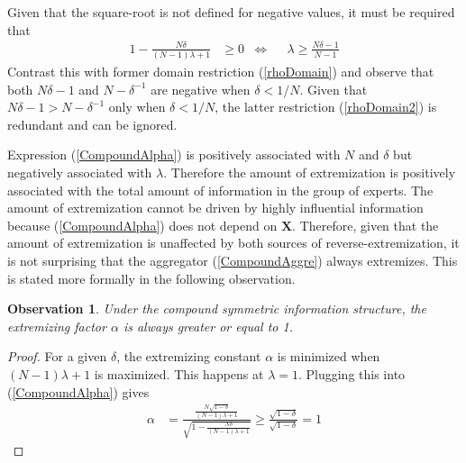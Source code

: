 \documentclass[11pt,twoside]{article}
\newtheorem{observation}[theorem]{Observation}
\theoremstyle{definition}
\theoremstyle{definition}
\begin{document}
Given that the square-root is not defined for negative values,  it must be required that
\begin{align}
1- \frac{N\delta}{(N-1)\lambda +1}  &\geq 0 &\Leftrightarrow&& \lambda \geq \frac{N\delta - 1}{N-1} \label{rhoDomain2}
\end{align}
Contrast this with former domain restriction (\ref{rhoDomain}) and observe that both $N\delta - 1$ and $N - \delta^{-1}$ are negative when $\delta < 1/N$. Given that $N\delta - 1 > N - \delta^{-1}$ only when $\delta < 1/N$, the latter restriction (\ref{rhoDomain2}) is redundant and can be ignored. 

Expression (\ref{CompoundAlpha}) is positively associated with $N$ and $\delta$ but negatively associated with $\lambda$. Therefore the amount of extremization is positively associated with the total amount of information in the group of experts. The amount of extremization cannot be driven by highly influential information because (\ref{CompoundAlpha}) does not depend on $\boldsymbol{X}$. Therefore, given that the amount of extremization is unaffected by both sources of reverse-extremization, it is not surprising that the aggregator (\ref{CompoundAggre}) always extremizes. This is stated more formally in the following observation.

\begin{observation}
\label{positiveThm}
Under the compound symmetric information structure, the extremizing factor $\alpha$ is always greater or equal to 1. 
\end{observation}
\begin{proof} 
For a given $\delta$, the extremizing constant $\alpha$ is minimized when $(N-1)\lambda +1$ is maximized. This happens at $\lambda = 1$. Plugging this into (\ref{CompoundAlpha}) gives
\begin{align*}
\alpha &= \frac{\frac{N\sqrt{1-\delta}}{(N-1)\lambda +1}}{\sqrt{1- \frac{N\delta}{(N-1)\lambda +1} }}  \geq \frac{\sqrt{1-\delta}}{\sqrt{1-\delta }} = 1
\end{align*}
\end{proof}
\end{document}
